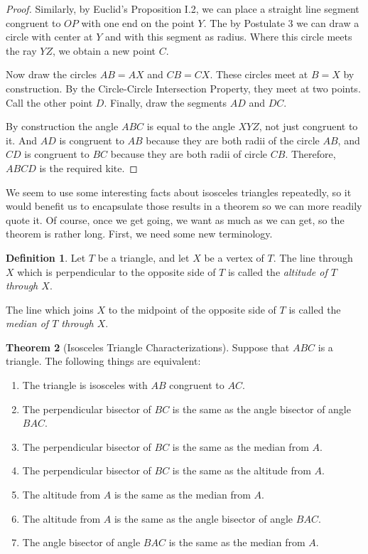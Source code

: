 \documentclass{tufte-handout}
\theoremstyle{definition}
\newtheorem{theorem}{Theorem}[section]
\newtheorem{definition}[theorem]{Definition}
\begin{document}
\begin{proof}
Similarly, by Euclid's Proposition I.2, we can place a straight line segment congruent to $OP$ with one end on the point $Y$. The by Postulate 3 we can draw a circle with center at $Y$ and with this segment as radius. Where this circle meets the ray $YZ$, we obtain a new point $C$.

Now draw the circles $AB = AX$ and $CB = CX$. These circles meet at $B = X$ by construction. By the Circle-Circle Intersection Property, they meet at two points. Call the other point $D$. Finally, draw the segments $AD$ and $DC$.

By construction the angle $ABC$ is equal to the angle $XYZ$, not just congruent to it. And $AD$ is congruent to $AB$ because they are both radii of the circle $AB$, and $CD$ is congruent to $BC$ because they are both radii of circle $CB$.
Therefore, $ABCD$ is the required kite.
\end{proof}


We seem to use some interesting facts about isosceles triangles repeatedly, so it would benefit us to encapsulate those results in a theorem so we can more readily quote it. Of course, once we get going, we want as much as we can get, so the theorem is rather long. First, we need some new terminology.

\begin{definition}\label{definition:classical-cevians} Let $T$ be a triangle, and let $X$ be a vertex of $T$. The line through $X$ which is perpendicular to the opposite side of $T$ is called the \emph{altitude of $T$ through $X$}.

The line which joins $X$ to the midpoint of the opposite side of $T$ is called the \emph{median of $T$ through $X$}.
\end{definition}



\begin{theorem}[Isosceles Triangle Characterizations] \label{theorem:isosceles-triangle-characterizations}
Suppose that $ABC$ is a triangle. The following things are equivalent:
\begin{enumerate}
\item The triangle is isosceles with $AB$ congruent to $AC$. \item The perpendicular bisector of $BC$ is the same as the angle bisector of angle $BAC$.
\item The perpendicular bisector of $BC$ is the same as the median from $A$.
\item The perpendicular bisector of $BC$ is the same as the altitude from $A$.
\item The altitude from $A$ is the same as the median from $A$.
\item The altitude from $A$ is the same as the angle bisector of angle $BAC$.
\item The angle bisector of angle $BAC$ is the same as the median from $A$.
\end{enumerate}
\end{theorem}
\end{document}
